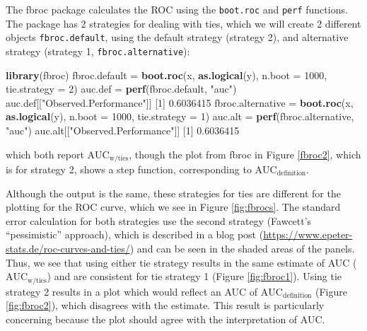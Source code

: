 \documentclass[smallextended]{svjour3}       %
\newenvironment{Shaded}{\begin{snugshade}}{\end{snugshade}}
\newcommand{\DataTypeTok}[1]{\textcolor[rgb]{0.13,0.29,0.53}{#1}}
\newcommand{\DecValTok}[1]{\textcolor[rgb]{0.00,0.00,0.81}{#1}}
\newcommand{\FloatTok}[1]{\textcolor[rgb]{0.00,0.00,0.81}{#1}}
\newcommand{\KeywordTok}[1]{\textcolor[rgb]{0.13,0.29,0.53}{\textbf{#1}}}
\newcommand{\NormalTok}[1]{#1}
\newcommand{\StringTok}[1]{\textcolor[rgb]{0.31,0.60,0.02}{#1}}
\begin{document}
The {\selectfont fbroc} package calculates the ROC using
the \texttt{boot.roc} and \texttt{perf} functions. The package has 2
strategies for dealing with ties, which we will create 2 different
objects \texttt{fbroc.default}, using the default strategy (strategy 2),
and alternative strategy (strategy 1, \texttt{fbroc.alternative}):

\begin{Shaded}
\begin{Highlighting}[]
\KeywordTok{library}\NormalTok{(fbroc)}
\NormalTok{fbroc.default =}\StringTok{ }\KeywordTok{boot.roc}\NormalTok{(x, }\KeywordTok{as.logical}\NormalTok{(y), }
                         \DataTypeTok{n.boot =} \DecValTok{1000}\NormalTok{, }\DataTypeTok{tie.strategy =} \DecValTok{2}\NormalTok{)}
\NormalTok{auc.def =}\StringTok{ }\KeywordTok{perf}\NormalTok{(fbroc.default, }\StringTok{"auc"}\NormalTok{)}
\NormalTok{auc.def[[}\StringTok{"Observed.Performance"}\NormalTok{]]}
\NormalTok{[}\DecValTok{1}\NormalTok{] }\FloatTok{0.6036415}
\NormalTok{fbroc.alternative =}\StringTok{ }\KeywordTok{boot.roc}\NormalTok{(x, }\KeywordTok{as.logical}\NormalTok{(y), }
                             \DataTypeTok{n.boot =} \DecValTok{1000}\NormalTok{, }\DataTypeTok{tie.strategy =} \DecValTok{1}\NormalTok{)}
\NormalTok{auc.alt =}\StringTok{ }\KeywordTok{perf}\NormalTok{(fbroc.alternative, }\StringTok{"auc"}\NormalTok{)}
\NormalTok{auc.alt[[}\StringTok{"Observed.Performance"}\NormalTok{]]}
\NormalTok{[}\DecValTok{1}\NormalTok{] }\FloatTok{0.6036415}
\end{Highlighting}
\end{Shaded}

which both report \(\text{AUC}_{\text{w/ties}}\), though the plot from
{\selectfont fbroc} in Figure \ref{fbroc2}, which is for
strategy 2, shows a step function, corresponding to
\(\text{AUC}_{\text{definition}}\).

Although the output is the same, these strategies for ties are different
for the plotting for the ROC curve, which we see in Figure
\ref{fig:fbrocs}. The standard error calculation for both strategies use
the second strategy (Fawcett's ``pessimistic'' approach), which is
described in a blog post
(\url{https://www.epeter-stats.de/roc-curves-and-ties/}) and can be seen
in the shaded areas of the panels. Thus, we see that using either tie
strategy results in the same estimate of AUC
(\(\text{AUC}_{\text{w/ties}}\)) and are consistent for tie strategy 1
(Figure \ref{fig:fbroc1}). Using tie strategy 2 results in a plot which
would reflect an AUC of \(\text{AUC}_{\text{definition}}\) (Figure
\ref{fig:fbroc2}), which disagrees with the estimate. This result is
particularly concerning because the plot should agree with the
interpretation of AUC.
\end{document}
